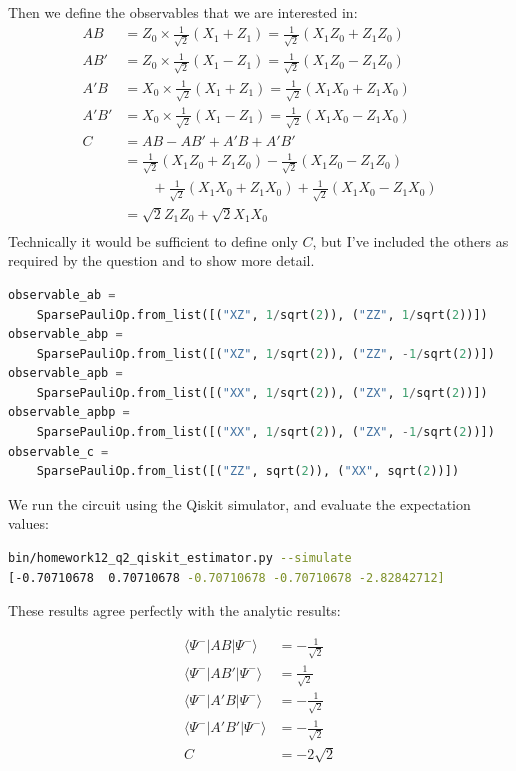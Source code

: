 \documentclass[12pt]{extarticle}
\begin{document}
\begin{enumerate}[(a)]
Then we define the observables that we are interested in:
\begin{align*}
AB & = Z_0 \times \frac{1}{\sqrt{2}} (X_1 + Z_1) = \frac{1}{\sqrt{2}} (X_1 Z_0 + Z_1 Z_0) \\
AB' & = Z_0 \times \frac{1}{\sqrt{2}} (X_1 - Z_1) = \frac{1}{\sqrt{2}} (X_1 Z_0 - Z_1 Z_0) \\
A'B & = X_0 \times \frac{1}{\sqrt{2}} (X_1 + Z_1) = \frac{1}{\sqrt{2}} (X_1 X_0 + Z_1 X_0) \\
A'B' & = X_0 \times \frac{1}{\sqrt{2}} (X_1 - Z_1) = \frac{1}{\sqrt{2}} (X_1 X_0 - Z_1 X_0) \\
C & = AB - AB' + A'B + A'B' \\
& = \frac{1}{\sqrt{2}}(X_1 Z_0 + Z_1 Z_0) - \frac{1}{\sqrt{2}} (X_1 Z_0 - Z_1 Z_0) \\
& \qquad + \frac{1}{\sqrt{2}} (X_1 X_0 + Z_1 X_0) + \frac{1}{\sqrt{2}} (X_1 X_0 - Z_1 X_0) \\
& = \sqrt{2} Z_1 Z_0 + \sqrt{2} X_1 X_0 \\
\end{align*}
Technically it would be sufficient to define only $C$, but I've included the others as required by the question and to show more detail.
\begin{small}
\begin{lstlisting}[language=python]
observable_ab =
    SparsePauliOp.from_list([("XZ", 1/sqrt(2)), ("ZZ", 1/sqrt(2))])
observable_abp =
    SparsePauliOp.from_list([("XZ", 1/sqrt(2)), ("ZZ", -1/sqrt(2))])
observable_apb =
    SparsePauliOp.from_list([("XX", 1/sqrt(2)), ("ZX", 1/sqrt(2))])
observable_apbp =
    SparsePauliOp.from_list([("XX", 1/sqrt(2)), ("ZX", -1/sqrt(2))])
observable_c =
    SparsePauliOp.from_list([("ZZ", sqrt(2)), ("XX", sqrt(2))])
\end{lstlisting}
\end{small}

We run the circuit using the Qiskit simulator, and evaluate the expectation values:

\begin{lstlisting}[language=bash]
bin/homework12_q2_qiskit_estimator.py --simulate
[-0.70710678  0.70710678 -0.70710678 -0.70710678 -2.82842712]
\end{lstlisting}

These results agree perfectly with the analytic results:

\begin{align*}
\langle \Psi^{-}|AB|\Psi^{-}\rangle & = -\frac{1}{\sqrt{2}} \\
\langle \Psi^{-}|AB'|\Psi^{-}\rangle & = \frac{1}{\sqrt{2}} \\
\langle \Psi^{-}|A'B|\Psi^{-}\rangle & = -\frac{1}{\sqrt{2}} \\
\langle \Psi^{-}|A'B'|\Psi^{-}\rangle & = -\frac{1}{\sqrt{2}} \\
C & = -2\sqrt{2}
\end{align*}


\end{enumerate}
\end{document}
